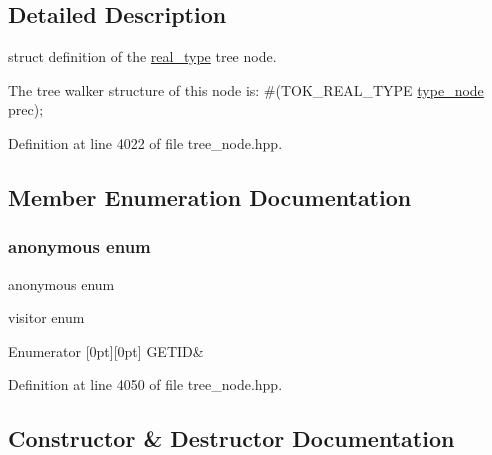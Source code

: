 \subsection{Detailed Description}
struct definition of the \hyperlink{structreal__type}{real\+\_\+type} tree node. 

The tree walker structure of this node is\+: \#(T\+O\+K\+\_\+\+R\+E\+A\+L\+\_\+\+T\+Y\+PE \hyperlink{structtype__node}{type\+\_\+node} prec); 

Definition at line 4022 of file tree\+\_\+node.\+hpp.



\subsection{Member Enumeration Documentation}
\mbox{\label{structreal__type_a12f30468709eceaa6491d02ced7edcec}} 
\subsubsection{\texorpdfstring{anonymous enum}{anonymous enum}}
{\footnotesize\ttfamily anonymous enum}



visitor enum 

\begin{DoxyEnumFields}{Enumerator}
[0pt][0pt]{}\mbox{\label{structreal__type_a12f30468709eceaa6491d02ced7edcecab33ab90ad121b175037ee24c7c1f1be9}} 
G\+E\+T\+ID&\\
\hline

\end{DoxyEnumFields}


Definition at line 4050 of file tree\+\_\+node.\+hpp.



\subsection{Constructor \& Destructor Documentation}
\mbox{\label{structreal__type_a6fa9dbfd07e2f6abdef7c106f3cda19b}} 
